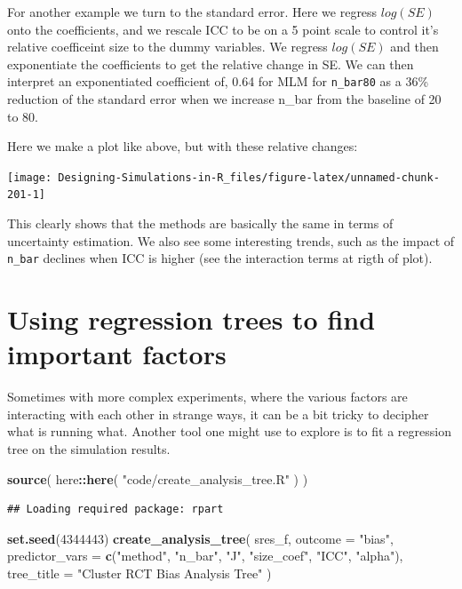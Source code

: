 \documentclass[
]{book}
\newenvironment{Shaded}{\begin{snugshade}}{\end{snugshade}}
\newcommand{\AttributeTok}[1]{\textcolor[rgb]{0.13,0.29,0.53}{#1}}
\newcommand{\DecValTok}[1]{\textcolor[rgb]{0.00,0.00,0.81}{#1}}
\newcommand{\FunctionTok}[1]{\textcolor[rgb]{0.13,0.29,0.53}{\textbf{#1}}}
\newcommand{\NormalTok}[1]{#1}
\newcommand{\SpecialCharTok}[1]{\textcolor[rgb]{0.81,0.36,0.00}{\textbf{#1}}}
\newcommand{\StringTok}[1]{\textcolor[rgb]{0.31,0.60,0.02}{#1}}
\begin{document}
For another example we turn to the standard error.
Here we regress \(log(SE)\) onto the coefficients, and we rescale ICC to be on a 5 point scale to control it's relative coefficeint size to the dummy variables.
We regress \(log(SE)\) and then exponentiate the coefficients to get the relative change in SE.
We can then interpret an exponentiated coefficient of, 0.64 for MLM for \texttt{n\_bar80} as a 36\% reduction of the standard error when we increase n\_bar from the baseline of 20 to 80.

Here we make a plot like above, but with these relative changes:

\begin{center}\texttt{[image: Designing-Simulations-in-R\_files/figure-latex/unnamed-chunk-201-1]} \end{center}

This clearly shows that the methods are basically the same in terms of uncertainty estimation.
We also see some interesting trends, such as the impact of \texttt{n\_bar} declines when ICC is higher (see the interaction terms at rigth of plot).

\section{Using regression trees to find important factors}\label{using-regression-trees-to-find-important-factors}

Sometimes with more complex experiments, where the various factors are interacting with each other in strange ways, it can be a bit tricky to decipher what is running what.
Another tool one might use to explore is to fit a regression tree on the simulation results.

\begin{Shaded}
\begin{Highlighting}[]
\FunctionTok{source}\NormalTok{( here}\SpecialCharTok{::}\FunctionTok{here}\NormalTok{( }\StringTok{"code/create\_analysis\_tree.R"}\NormalTok{ ) )}
\end{Highlighting}
\end{Shaded}

\begin{verbatim}
## Loading required package: rpart
\end{verbatim}

\begin{Shaded}
\begin{Highlighting}[]
\FunctionTok{set.seed}\NormalTok{(}\DecValTok{4344443}\NormalTok{)}
\FunctionTok{create\_analysis\_tree}\NormalTok{( sres\_f,}
                      \AttributeTok{outcome =} \StringTok{"bias"}\NormalTok{,}
                      \AttributeTok{predictor\_vars =} \FunctionTok{c}\NormalTok{(}\StringTok{"method"}\NormalTok{, }\StringTok{"n\_bar"}\NormalTok{, }\StringTok{"J"}\NormalTok{,}
                                         \StringTok{"size\_coef"}\NormalTok{, }\StringTok{"ICC"}\NormalTok{, }\StringTok{"alpha"}\NormalTok{),}
                      \AttributeTok{tree\_title =} \StringTok{"Cluster RCT Bias Analysis Tree"}\NormalTok{ )}
\end{Highlighting}
\end{Shaded}
\end{document}
